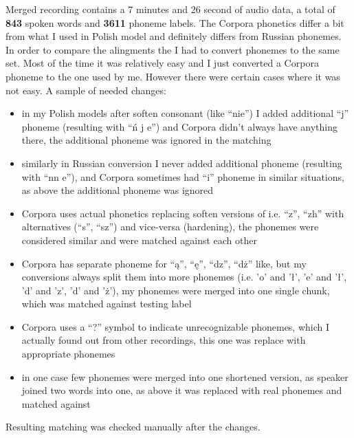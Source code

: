 \documentclass[12pt,a4paper,english]{article}
\begin{document}
Merged recording contains a 7 minutes and 26 second of audio data, a total of \textbf{843} spoken words and \textbf{3611} phoneme labels. \newline
The Corpora phonetics differ a bit from what I used in Polish model and definitely differs from Russian phonemes. In order to compare the alingments the I had to convert phonemes to the same set. Most of the time it was relatively easy and I just converted a Corpora phoneme to the one used by me. However there were certain cases where it was not easy.\newline
A sample of needed changes: \newline
\begin{itemize}
    \item in my Polish models after soften consonant (like “nie”) I added additional “j” phoneme (resulting with “ń j e”) and Corpora didn't always have anything there, \newline
    the additional phoneme was ignored in the matching
    \item similarly in Russian conversion I never added additional phoneme (resulting with “nn e”), and Corpora sometimes had “i” phoneme in similar situations, \newline
    as above the additional phoneme was ignored
    \item Corpora uses actual phonetics replacing soften versions of i.e. “z”, “zh” with alternatives (“s”, “sz”) and vice-versa (hardening), \newline
    the phonemes were considered similar and were matched against each other
    \item Corpora has separate phoneme for “ą”, “ę”, “dz”, “dż” like, but my conversions always split them into more phonemes (i.e. 'o' and 'ł', 'e' and 'ł', 'd' and 'z', 'd' and 'ż'), \newline
    my phonemes were merged into one single chunk, which was matched against testing label
    \item Corpora uses a “?” symbol to indicate unrecognizable phonemes, which I actually found out from other recordings, \newline
    this one was replace with appropriate phonemes
    \item in one case few phonemes were merged into one shortened version, as speaker joined two words into one, \newline
    as above it was replaced with real phonemes and matched against
\end{itemize}
Resulting matching was checked manually after the changes. \newline
\end{document}
